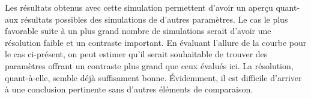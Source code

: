 \documentclass[conference]{IEEEtran}
\begin{document}
Les résultats obtenus avec cette simulation permettent d'avoir un aperçu quant-aux
résultats possibles des simulations de d'autres paramètres. Le cas le plus favorable suite à 
un plus grand nombre de simulations serait d'avoir une résolution faible
et un contraste important. En évaluant l'allure de la courbe pour le cas ci-présent, on peut estimer
qu'il serait souhaitable de trouver des paramètres offrant un contraste plus grand que ceux évalués ici.
La résolution, quant-à-elle, semble déjà suffisament bonne. Évidemment, il est difficile d'arriver à une 
conclusion pertinente sans d'autres éléments de comparaison.



\clearpage

% 
% 
\end{document}
